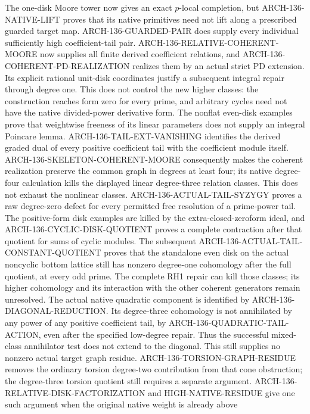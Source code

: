 \documentclass[11pt,a4paper]{article}
\begin{document}
The one-disk Moore tower now gives an exact $p$-local completion,
but ARCH-136-NATIVE-LIFT proves that its native primitives need not
lift along a prescribed guarded target map. ARCH-136-GUARDED-PAIR
does supply every individual sufficiently high coefficient-tail
pair. ARCH-136-RELATIVE-COHERENT-MOORE now supplies all finite
derived coefficient relations, and ARCH-136-COHERENT-PD-REALIZATION
realizes them by an actual strict PD extension. Its explicit rational
unit-disk coordinates justify a subsequent integral repair through
degree one. This does not control the new higher classes: the
construction reaches form zero for every prime, and arbitrary cycles
need not have the native divided-power derivative form. The nonflat
even-disk examples prove that weightwise freeness of its linear
parameters does not supply an integral Poincare lemma.
ARCH-136-TAIL-EXT-VANISHING identifies the derived graded dual of
every positive coefficient tail with the coefficient module itself.
ARCH-136-SKELETON-COHERENT-MOORE consequently makes the coherent
realization preserve the common graph in degrees at least four;
its native degree-four calculation kills the displayed linear
degree-three relation classes. This does not exhaust the nonlinear
classes. ARCH-136-ACTUAL-TAIL-SYZYGY proves a raw degree-zero defect
for every permitted free resolution of a prime-power tail. The
positive-form disk examples are killed by the extra-closed-zeroform
ideal, and ARCH-136-CYCLIC-DISK-QUOTIENT proves a complete contraction
after that quotient for sums of cyclic modules. The subsequent
ARCH-136-ACTUAL-TAIL-CONSTANT-QUOTIENT proves that the standalone
even disk on the actual noncyclic bottom lattice still has nonzero
degree-one cohomology after the full quotient, at every odd prime.
The complete RH1 repair can kill those classes; its higher cohomology
and its interaction with the other coherent generators remain unresolved.
The actual native quadratic component is identified by
ARCH-136-DIAGONAL-REDUCTION. Its degree-three cohomology is not
annihilated by any power of any positive coefficient tail, by
ARCH-136-QUADRATIC-TAIL-ACTION, even after the specified low-degree
repair. Thus the successful mixed-class annihilator test does not
extend to the diagonal. This still supplies no nonzero actual target
graph residue. ARCH-136-TORSION-GRAPH-RESIDUE removes the ordinary
torsion degree-two contribution from that cone obstruction; the
degree-three torsion quotient still requires a separate argument.
ARCH-136-RELATIVE-DISK-FACTORIZATION and HIGH-NATIVE-RESIDUE give
one such argument when the original native weight is already above
\end{document}
